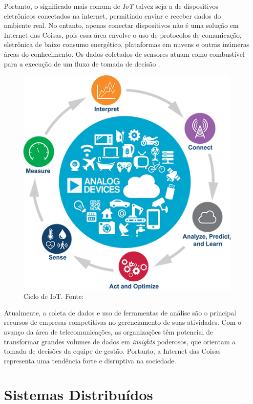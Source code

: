 Portanto, o significado mais comum de \textit{IoT} talvez seja a de dispositivos eletrônicos conectados na internet, permitindo enviar e receber dados do ambiente real. No entanto, apenas conectar dispositivos não é uma solução em Internet das Coisas, pois essa área envolve o uso de protocolos de comunicação, eletrônica de baixo consumo energético, plataformas em nuvens e outras inúmeras áreas do conhecimento. Os dados coletados de sensores atuam como combustível para a execução de um fluxo de tomada de decisão \cite{iot-cycle}. 

\begin{figure}[ht]
    \centering
    \includegraphics[width=.65\textwidth]{img/iot-cycle.png}
    \caption{Ciclo de IoT. Fonte:\cite{iot-cycle}}\label{figIoTCycle}
\end{figure}

Atualmente, a coleta de dados e uso de ferramentas de análise são o principal recursos de empresas competitivas no gerenciamento de suas atividades. Com o avanço da área de telecomunicações, as organizações têm potencial de transformar grandes volumes de dados em \textit{insights} poderosos, que orientam a tomada de decisões da equipe de gestão. Portanto, a Internet das Coisas representa uma tendência forte e disruptiva na sociedade.

\section{Sistemas Distribuídos}


